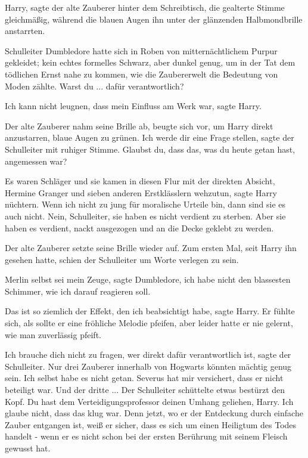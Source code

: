 \glqq{}Harry\grqq{}, sagte der alte Zauberer hinter dem Schreibtisch, die
gealterte Stimme gleichmäßig, während die blauen Augen ihn unter der glänzenden
Halbmondbrille anstarrten.

Schulleiter Dumbledore hatte sich in Roben von mitternächtlichem Purpur
gekleidet; kein echtes formelles Schwarz, aber dunkel genug, um in der Tat dem
tödlichen Ernst nahe zu kommen, wie die Zaubererwelt die Bedeutung von Moden
zählte. \glqq{}Warst du ... dafür verantwortlich?\grqq{}

\glqq{}Ich kann nicht leugnen, dass mein Einfluss am Werk war\grqq{}, sagte
Harry.

Der alte Zauberer nahm seine Brille ab, beugte sich vor, um Harry direkt
anzustarren, blaue Augen zu grünen. \glqq{}Ich werde dir eine Frage
stellen\grqq{}, sagte der Schulleiter mit ruhiger Stimme. \glqq{}Glaubst du, dass
das, was du heute getan hast, angemessen war?\grqq{}

\glqq{}Es waren Schläger und sie kamen in diesen Flur mit der direkten Absicht,
Hermine Granger und sieben anderen Erstklässlern wehzutun\grqq{}, sagte Harry
nüchtern. \glqq{}Wenn ich nicht zu jung für moralische Urteile bin, dann sind sie
es auch nicht. Nein, Schulleiter, sie haben es nicht verdient zu sterben. Aber
sie haben es verdient, nackt ausgezogen und an die Decke geklebt zu
werden.\grqq{}

Der alte Zauberer setzte seine Brille wieder auf. Zum ersten Mal, seit Harry ihn
gesehen hatte, schien der Schulleiter um Worte verlegen zu sein.

\glqq{}Merlin selbst sei mein Zeuge\grqq{}, sagte Dumbledore, \glqq{}ich habe
nicht den blassesten Schimmer, wie ich darauf reagieren soll.\grqq{}

\glqq{}Das ist so ziemlich der Effekt, den ich beabsichtigt habe\grqq{}, sagte
Harry. Er fühlte sich, als sollte er eine fröhliche Melodie pfeifen, aber leider
hatte er nie gelernt, wie man zuverlässig pfeift.

\glqq{}Ich brauche dich nicht zu fragen, wer direkt dafür verantwortlich
ist\grqq{}, sagte der Schulleiter. \glqq{}Nur drei Zauberer innerhalb von
Hogwarts könnten mächtig genug sein. Ich selbst habe es nicht getan. Severus hat
mir versichert, dass er nicht beteiligt war. Und der dritte ...\grqq{} Der
Schulleiter schüttelte etwas bestürzt den Kopf. \glqq{}Du hast dem
Verteidigungsprofessor deinen Umhang geliehen, Harry. Ich glaube nicht, dass das
klug war. Denn jetzt, wo er der Entdeckung durch einfache Zauber entgangen ist,
weiß er sicher, dass es sich um einen Heiligtum des Todes handelt - wenn er es
nicht schon bei der ersten Berührung mit seinem Fleisch gewusst hat.\grqq{}


